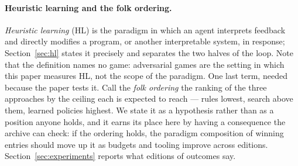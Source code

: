 \paragraph{Heuristic learning and the folk ordering.}
\emph{Heuristic learning} (HL) is the paradigm in which an agent interprets
feedback and directly modifies a program, or another interpretable system, in
response; Section~\ref{sec:hl} states it precisely and separates the two halves
of the loop. Note that the definition names no game: adversarial games are the
setting in which this paper measures HL, not the scope of the paradigm. One last
term, needed because the paper tests it. Call the \emph{folk
ordering} the ranking of the three approaches by the ceiling each is expected to
reach --- rules lowest, search above them, learned policies highest. We state it
as a hypothesis rather than as a position anyone holds, and it earns its place
here by having a consequence the archive can check: if the ordering holds, the
paradigm composition of winning entries should move up it as budgets and tooling
improve across editions. Section~\ref{sec:experiments} reports what
 editions of outcomes say.
